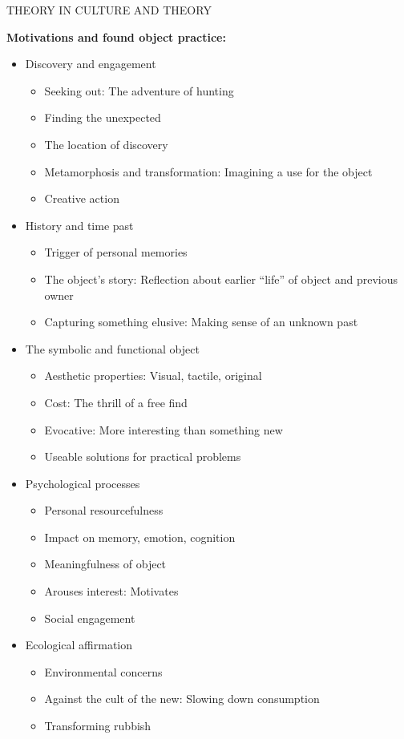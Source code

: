THEORY IN CULTURE AND THEORY


\textbf{Motivations and found object practice:}
\begin{itemize}
\item Discovery and engagement
  \begin{itemize}
  \item Seeking out: The adventure of hunting
  \item Finding the unexpected
  \item The location of discovery
  \item Metamorphosis and transformation: Imagining a use for the object
  \item Creative action
  \end{itemize}
\item History and time past
  \begin{itemize}
  \item Trigger of personal memories
  \item The object’s story: Reflection about earlier “life” of object and previous owner
  \item Capturing something elusive: Making sense of an unknown past
  \end{itemize}
\item The symbolic and functional object
  \begin{itemize}
  \item Aesthetic properties: Visual, tactile, original
  \item Cost: The thrill of a free find
  \item Evocative: More interesting than something new
  \item Useable solutions for practical problems
  \end{itemize}
\item Psychological processes
  \begin{itemize}
  \item Personal resourcefulness
  \item Impact on memory, emotion, cognition
  \item Meaningfulness of object
  \item Arouses interest: Motivates
  \item Social engagement
  \end{itemize}
\item Ecological affirmation
  \begin{itemize}
  \item Environmental concerns
  \item Against the cult of the new: Slowing down consumption
  \item Transforming rubbish
  \end{itemize}
\end{itemize}


